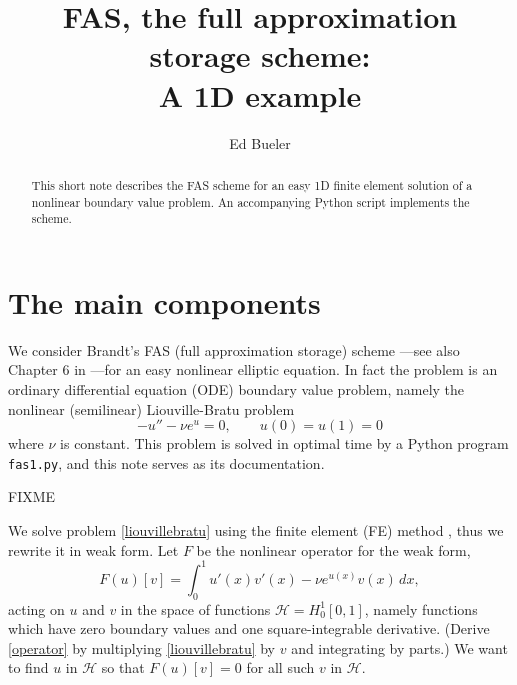 \documentclass[letterpaper,final,12pt,reqno]{amsart}
\begin{document}
\title[FAS, the full approximation storage scheme]{FAS, the full approximation storage scheme: \\ A 1D example}

\author{Ed Bueler}

\begin{abstract}  This short note describes the FAS scheme for an easy 1D finite element solution of a nonlinear boundary value problem.  An accompanying Python script implements the scheme.
\end{abstract}

\maketitle

\thispagestyle{empty}
\bigskip

\section{The main components}

We consider Brandt's FAS (full approximation storage) scheme \cite{Brandt1977}---see also Chapter 6 in \cite{Briggsetal2000}---for an easy nonlinear elliptic equation.  In fact the problem is an ordinary differential equation (ODE) boundary value problem, namely the nonlinear (semilinear) Liouville-Bratu problem \cite[for example]{Bueler2021}
\begin{equation}
  -u'' - \nu e^u = 0,  \qquad u(0) = u(1) = 0  \label{liouvillebratu}
\end{equation}
where $\nu$ is constant.  This problem is solved in optimal time by a Python program \texttt{fas1.py}, and this note serves as its documentation.

FIXME

We solve problem \eqref{liouvillebratu} using the finite element (FE) method \cite{Bueler2021,Elmanetal2014}, thus we rewrite it in weak form.  Let $F$ be the nonlinear operator for the weak form,
\begin{equation}
  F(u)[v] = \int_0^1 u'(x) v'(x) - \nu e^{u(x)} v(x)\, dx,  \label{operator}
\end{equation}
acting on $u$ and $v$ in the space of functions $\mathcal{H}=H_0^1[0,1]$, namely functions which have zero boundary values and one square-integrable derivative.  (Derive \eqref{operator} by multiplying \eqref{liouvillebratu} by $v$ and integrating by parts.)  We want to find $u$ in $\mathcal{H}$ so that $F(u)[v] = 0$ for all such $v$ in $\mathcal{H}$.
\end{document}
